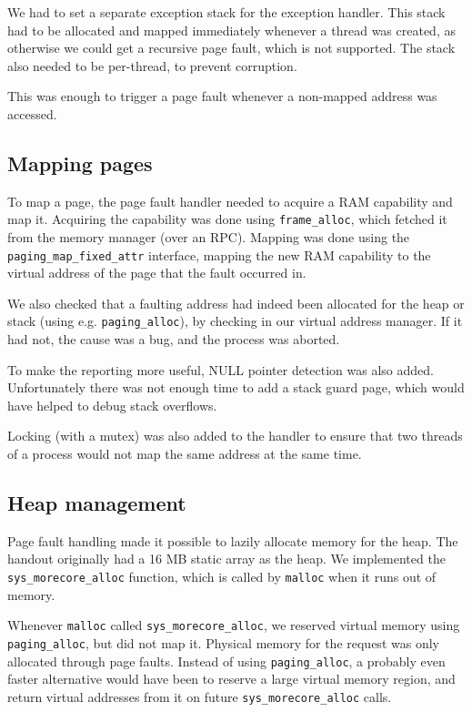 We had to set a separate exception stack for the exception handler.
This stack had to be allocated and mapped immediately whenever a thread was created, as otherwise we could get a recursive page fault, which is not supported.
The stack also needed to be per-thread, to prevent corruption.

This was enough to trigger a page fault whenever a non-mapped address was accessed.

\subsection{Mapping pages}

To map a page, the page fault handler needed to acquire a RAM capability and map it.
Acquiring the capability was done using \verb|frame_alloc|, which fetched it from the memory manager (over an RPC).
Mapping was done using the \verb|paging_map_fixed_attr| interface, mapping the new RAM capability to the virtual address of the page that the fault occurred in.

We also checked that a faulting address had indeed been allocated for the heap or stack (using e.g. \verb|paging_alloc|), by checking in our virtual address manager.
If it had not, the cause was a bug, and the process was aborted.

To make the reporting more useful, NULL pointer detection was also added.
Unfortunately there was not enough time to add a stack guard page, which would have helped to debug stack overflows.

Locking (with a mutex) was also added to the handler to ensure that two threads of a process would not map the same address at the same time.


\subsection{Heap management}

Page fault handling made it possible to lazily allocate memory for the heap.
The handout originally had a 16 MB static array as the heap.
We implemented the \verb|sys_morecore_alloc| function, which is called by \verb|malloc| when it runs out of memory.

Whenever \verb|malloc| called \verb|sys_morecore_alloc|, we reserved virtual memory using \verb|paging_alloc|, but did not map it.
Physical memory for the request was only allocated through page faults.
Instead of using \verb|paging_alloc|, a probably even faster alternative would have been to reserve a large virtual memory region, and return virtual addresses from it on future \verb|sys_morecore_alloc| calls.


